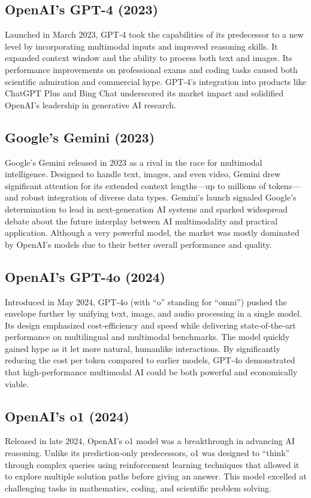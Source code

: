 \documentclass[11pt,twoside]{article}
\begin{document}
\subsection{OpenAI's GPT-4 (2023)}
Launched in March 2023, GPT‑4 took the capabilities of its predecessor to a new level by incorporating multimodal inputs and improved reasoning skills. It expanded context window and the ability to process both text and images. Its performance improvements on professional exams and coding tasks caused both scientific admiration and commercial hype. GPT‑4’s integration into products like ChatGPT Plus and Bing Chat underscored its market impact and solidified OpenAI’s leadership in generative AI research.

\subsection{Google's Gemini (2023)}
Google’s Gemini released in 2023 as a rival in the race for multimodal intelligence. Designed to handle text, images, and even video, Gemini drew significant attention for its extended context lengths—up to millions of tokens—and robust integration of diverse data types. Gemini’s launch signaled Google’s determination to lead in next‑generation AI systems and sparked widespread debate about the future interplay between AI multimodality and practical application. Although a very powerful model, the market was mostly dominated by OpenAI's models due to their better overall performance and quality.

\subsection{OpenAI's GPT-4o (2024)}
Introduced in May 2024, GPT‑4o (with “o” standing for “omni”) pushed the envelope further by unifying text, image, and audio processing in a single model. Its design emphasized cost‑efficiency and speed while delivering state‑of‑the‑art performance on multilingual and multimodal benchmarks. The model quickly gained hype as it let more natural, humanlike interactions. By significantly reducing the cost per token compared to earlier models, GPT‑4o demonstrated that high‑performance multimodal AI could be both powerful and economically viable.

\subsection{OpenAI's o1 (2024)}
Released in late 2024, OpenAI’s o1 model was a breakthrough in advancing AI reasoning. Unlike its prediction‑only predecessors, o1 was designed to “think” through complex queries using reinforcement learning techniques that allowed it to explore multiple solution paths before giving an answer. This model excelled at challenging tasks in mathematics, coding, and scientific problem solving.
\end{document}
